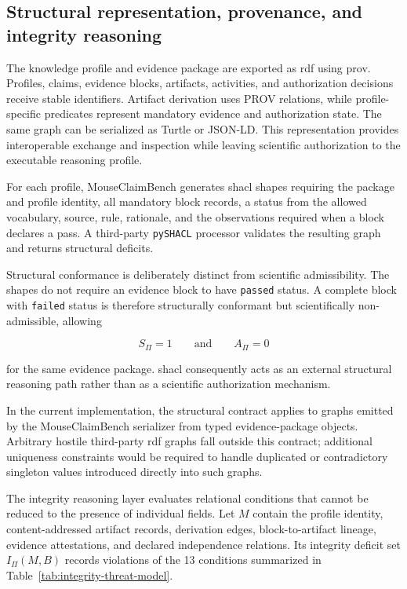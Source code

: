 \documentclass[11pt,a4paper]{article}
\begin{document}
\subsection{Structural representation, provenance, and integrity reasoning}
\label{subsec:standards-integrity}

The knowledge profile and evidence package are exported as \ac{rdf} using
\ac{prov}. Profiles, claims, evidence blocks, artifacts, activities, and
authorization decisions receive stable identifiers. Artifact derivation uses
PROV relations, while profile-specific predicates represent mandatory
evidence and authorization state. The same graph can be serialized as Turtle
or JSON-LD. This representation provides interoperable exchange and
inspection while leaving scientific authorization to the executable reasoning
profile.

For each profile, MouseClaimBench generates \ac{shacl} shapes requiring the
package and profile identity, all mandatory block records, a status from the
allowed vocabulary, source, rule, rationale, and the observations required
when a block declares a pass. A third-party \texttt{pySHACL} processor
validates the resulting graph and returns structural deficits.

Structural conformance is deliberately distinct from scientific
admissibility. The shapes do not require an evidence block to have
\texttt{passed} status. A complete block with \texttt{failed} status is
therefore structurally conformant but scientifically non-admissible, allowing

\[
S_{\Pi}=1
\qquad\text{and}\qquad
A_{\Pi}=0
\]

for the same evidence package. \ac{shacl} consequently acts as an external
structural reasoning path rather than as a scientific authorization
mechanism.

In the current implementation, the structural contract applies to graphs
emitted by the MouseClaimBench serializer from typed evidence-package
objects. Arbitrary hostile third-party \ac{rdf} graphs fall outside this
contract; additional uniqueness constraints would be required to handle
duplicated or contradictory singleton values introduced directly into such
graphs.

The integrity reasoning layer evaluates relational conditions that cannot be
reduced to the presence of individual fields. Let $M$ contain the profile
identity, content-addressed artifact records, derivation edges,
block-to-artifact lineage, evidence attestations, and declared independence
relations. Its integrity deficit set $I_{\Pi}(M,B)$ records violations of the
13 conditions summarized in Table~\ref{tab:integrity-threat-model}.
\end{document}

